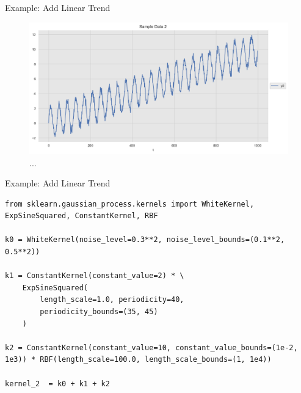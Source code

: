 \documentclass[10pt]{beamer}
\begin{document}
\begin{frame}{Example: Add Linear Trend }
\begin{center}
\begin{figure}
\includegraphics[scale=0.4]{images/gaussian_process_time_series_files/gaussian_process_time_series_37_0.png} 
\caption{ ...  }
\end{figure}
\end{center}
\end{frame}

\begin{frame}[fragile]{Example: Add Linear Trend }
\begin{lstlisting}
from sklearn.gaussian_process.kernels import WhiteKernel, ExpSineSquared, ConstantKernel, RBF

k0 = WhiteKernel(noise_level=0.3**2, noise_level_bounds=(0.1**2, 0.5**2))

k1 = ConstantKernel(constant_value=2) * \ 
    ExpSineSquared(
        length_scale=1.0, periodicity=40, 
        periodicity_bounds=(35, 45)
    )

k2 = ConstantKernel(constant_value=10, constant_value_bounds=(1e-2, 1e3)) * RBF(length_scale=100.0, length_scale_bounds=(1, 1e4)) 

kernel_2  = k0 + k1 + k2
\end{lstlisting}
\end{frame}
\end{document}
